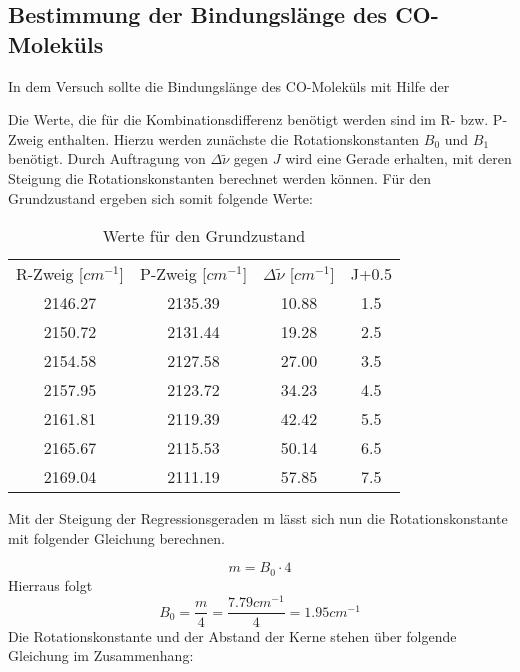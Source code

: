 \documentclass[12pt]{article}
\begin{document}
\subsection{Bestimmung der Bindungslänge des CO-Moleküls}
In dem Versuch sollte die Bindungslänge des CO-Moleküls mit Hilfe der 

Die Werte, die für die Kombinationsdifferenz benötigt werden sind im R- bzw. P-Zweig enthalten. 
Hierzu werden zunächste die Rotationskonstanten $B_0$ und $B_1$ benötigt.
Durch Auftragung von $\Delta \tilde {\nu}$ gegen $J$ wird eine Gerade erhalten, 
mit deren Steigung die Rotationskonstanten berechnet werden können. 
Für den Grundzustand ergeben sich somit folgende Werte:

\begin{table}[htpb]
  \centering
  \caption{Werte für den Grundzustand}
  \label{tab:grund}
  \begin{tabular}{cccc}
    R-Zweig [$cm^{-1}$] & P-Zweig [$cm^{-1}$] & $\Delta \tilde {\nu}$ [$cm^{-1}$] & J+0.5\\
    2146.27 & 2135.39 & 10.88 & 1.5 \\
2150.72 & 2131.44 &  19.28 & 2.5\\
2154.58 & 2127.58 &  27.00 & 3.5\\
2157.95 & 2123.72 &  34.23 & 4.5\\
2161.81 & 2119.39 &  42.42 & 5.5\\
2165.67 & 2115.53 &  50.14 & 6.5\\
2169.04 & 2111.19 &  57.85 & 7.5\\
  
  
  \end{tabular}

\end{table}



Mit der Steigung der Regressionsgeraden m lässt sich nun die Rotationskonstante mit folgender Gleichung berechnen.

\begin{equation}
    m = B_0 \cdot 4
\end{equation}
 Hierraus folgt 
 \begin{equation}
     B_0 = \frac{m}{4} = \frac{7.79 cm^{-1}}{4} = 1.95 cm ^{-1}
 \end{equation}
  Die Rotationskonstante und der Abstand der Kerne stehen über folgende Gleichung im Zusammenhang:
  
\end{document}
